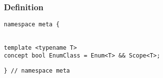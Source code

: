 
\subsubsection{Definition}

\begin{verbatim}
namespace meta {
\end{verbatim}
\begin{verbatim}

template <typename T>
concept bool EnumClass = Enum<T> && Scope<T>;

\end{verbatim}
\begin{verbatim}
} // namespace meta
\end{verbatim}
